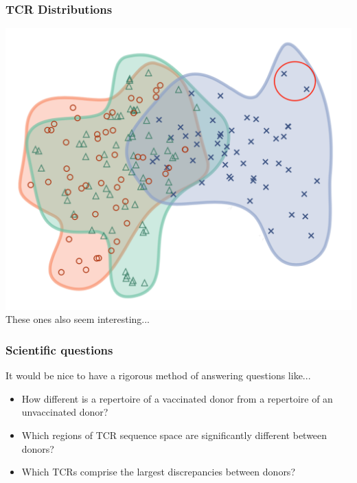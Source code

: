 \documentclass[mathserif,compress,xcolor={dvipsnames}]{beamer}
\renewcommand\;{\,}
\begin{document}
\begin{frame}\frametitle{TCR Distributions}
\begin{center}
\includegraphics[width=0.8\linewidth]{Figures/TCR_far.png}
\\
These ones also seem interesting...
\end{center}
\end{frame}

\begin{frame}\frametitle{Scientific questions}
It would be nice to have a rigorous method of answering questions like...
\bigskip
\begin{itemize}
\item How different is a repertoire of a vaccinated donor from a repertoire of an unvaccinated donor?
\bigskip
\item Which regions of TCR sequence space are significantly different between donors? 
\bigskip
\item
Which TCRs comprise the largest discrepancies between donors?
\end{itemize}
\end{frame}
\end{document}
